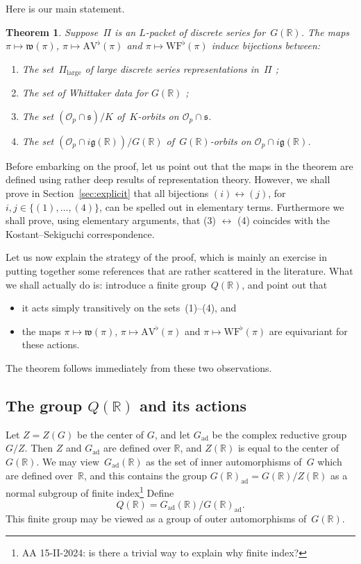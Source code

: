 \documentclass[10pt,leqno]{article}
\newtheorem{theorem}[equation]{Theorem}
\newcommand{\Gad}{G_\mathrm{ad}}
\renewcommand{\O}{\mathcal O}
\newcommand{\R}{\mathbb R}
\newcommand{\g}{\mathfrak g}
\newcommand{\s}{\mathfrak s}
\newcommand{\AV}{\mathrm{AV}}
\newcommand{\WF}{\mathrm{WF}}
\newcommand{\Op}{\O_p}
\begin{document}
Here is our main statement.

\begin{theorem} \label{th:main} Suppose~$\Pi$ is an $L$-packet of discrete series for~$G(\R)$. 
The maps $\pi \mapsto \mathfrak{w}(\pi)$, $\pi \mapsto \AV^\flat(\pi)$ and $\pi\mapsto \WF^\flat(\pi)$ induce bijections between:
\begin{enumerate}
\item[(1)] The set~$\Pi_{\mathrm{large}}$ of large discrete series representations in~$\Pi$ ;
\item[(2)] The set of Whittaker data for $G(\R)$ ;
\item[(3)] The set $(\Op \cap \s)/K$ of~$K$-orbits on $\mathcal{O}_p \cap \s$.
\item[(4)] The set $(\Op \cap i\g(\R))/G(\R)$ of~$G(\R)$-orbits on $\mathcal{O}_p \cap  i \g(\R)$.
\end{enumerate}
\end{theorem}

Before embarking on the proof, let us point out that the maps in the theorem are defined using rather deep results of representation theory. However, we shall prove in Section~\ref{sec:explicit} that all bijections $(i) \leftrightarrow (j)$, for $i,j \in \{(1), \dots, (4)\}$, can be spelled out in elementary terms. Furthermore we shall prove, using elementary arguments, that (3) $\leftrightarrow$ (4) coincides with the Kostant--Sekiguchi correspondence.  



Let us now explain the strategy of the proof, which is mainly an exercise in putting together some references that are rather scattered in the literature. What we shall actually do is: introduce a finite group~$Q(\R)$, and point out that 
\begin{itemize}
\item[(i)] it acts simply transitively on the sets~(1)--(4), and 
\item[(ii)] the maps $\pi \mapsto \mathfrak{w}(\pi)$, $\pi \mapsto \AV^\flat(\pi)$ and $\pi\mapsto \WF^\flat(\pi)$  are equivariant for these actions.
\end{itemize}
The theorem follows immediately from these two observations. 

\subsection{The group $Q(\R)$ and its actions} Let $Z=Z(G)$ be the center of $G$, and let $\Gad$ be the complex reductive group~$G/Z$.
Then $Z$ and $\Gad$ are defined over $\R$, and $Z(\R)$ is equal to the center of $G(\R)$. We may view~$\Gad(\R)$ as the set of inner automorphisms of~$G$ which are defined over~$\R$, and this contains the group $G(\R)_{\mathrm{ad}}=G(\R)/Z(\R)$ as a normal subgroup of finite index\footnote{AA 15-II-2024: is there a trivial way to explain why finite index?}
Define 
$$
Q(\R)=\Gad(\R)/G(\R)_{\mathrm{ad}}.
$$
This finite group may be viewed as a group of outer automorphisms of~$G(\R)$. 
\end{document}
